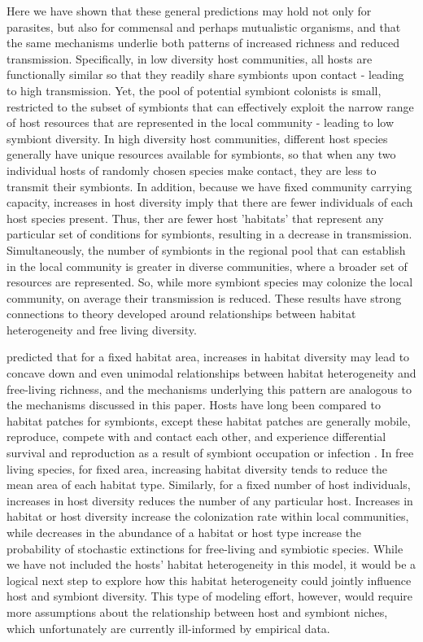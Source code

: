 Here we have shown that these general predictions may hold not only for parasites, but also for commensal and perhaps mutualistic organisms, and that the same mechanisms underlie both patterns of increased richness and reduced transmission.
Specifically, in low diversity host communities, all hosts are functionally similar so that they readily share symbionts upon contact - leading to high transmission.
Yet, the pool of potential symbiont colonists is small, restricted to the subset of symbionts that can effectively exploit the narrow range of host resources that are represented in the local community - leading to low symbiont diversity.
In high diversity host communities, different host species generally have unique resources available for symbionts, so that when any two individual hosts of randomly chosen species make contact, they are less to transmit their symbionts.
In addition, because we have fixed community carrying capacity, increases in host diversity imply that there are fewer individuals of each host species present.
Thus, ther are fewer host 'habitats' that represent any particular set of conditions for symbionts, resulting in a decrease in transmission.
Simultaneously, the number of symbionts in the regional pool that can establish in the local community is greater in diverse communities, where a broader set of resources are represented.
So, while more symbiont species may colonize the local community, on average their transmission is reduced.
These results have strong connections to theory developed around relationships between habitat heterogeneity and free living diversity.

\cite{Allouche2012} predicted that for a fixed habitat area, increases in habitat diversity may lead to concave down and even unimodal relationships between habitat heterogeneity and free-living richness, and the mechanisms underlying this pattern are analogous to the mechanisms discussed in this paper.
Hosts have long been compared to habitat patches for symbionts, except these habitat patches are generally mobile, reproduce, compete with and contact each other, and experience differential survival and reproduction as a result of symbiont occupation or infection \citep{Kuris1980, Mihaljevic2012}.
In free living species, for fixed area, increasing habitat diversity tends to reduce the mean area of each habitat type.
Similarly, for a fixed number of host individuals, increases in host diversity reduces the number of any particular host.
Increases in habitat or host diversity increase the colonization rate within local communities, while decreases in the abundance of a habitat or host type increase the probability of stochastic extinctions for free-living and symbiotic species.
While we have not included the hosts' habitat heterogeneity in this model, it would be a logical next step to explore how this habitat heterogeneity could jointly influence host and symbiont diversity.
This type of modeling effort, however, would require more assumptions about the relationship between host and symbiont niches, which unfortunately are currently ill-informed by empirical data.

